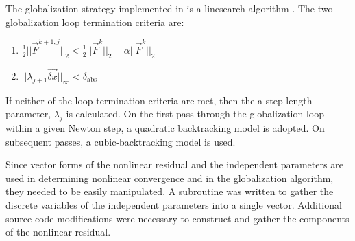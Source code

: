 The globalization strategy implemented in \cobra{} is a linesearch algorithm \cite{Dennis1996}.
The two globalization loop termination criteria are:

\begin{enumerate}
\item{$\frac{1}{2}||\vec{F}^{k+1, j}||_{2} < \frac{1}{2}||\vec{F}^{k}||_{2} - \alpha ||\vec{F}^{k}||_{2}$ }
\item{$||\lambda_{j+1} \vec{\delta x}||_{\infty} < \delta_{\text{abs}}$}
\end{enumerate}

If neither of the loop termination criteria are met, then the a step-length parameter, $\lambda_j$ is calculated.
On the first pass through the globalization loop within a given Newton step, a quadratic backtracking model is adopted.
On subsequent passes, a cubic-backtracking model is used.
 
Since vector forms of the nonlinear residual and the independent parameters are used in determining nonlinear convergence and in the globalization algorithm, they needed to be easily manipulated.
A subroutine was written to gather the discrete variables of the independent parameters into a single vector.
Additional source code modifications were necessary to construct and gather the components of the nonlinear residual.


